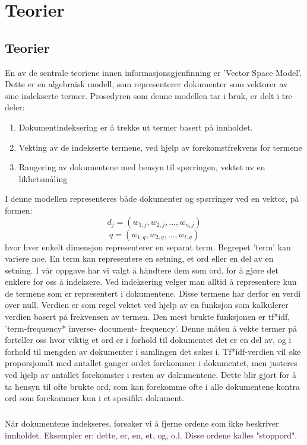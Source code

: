 \chapter{Teorier}
\section{Teorier}
En av de sentrale teoriene innen informasjonsgjenfinning er 'Vector Space Model'. Dette er en algebraisk modell, som representerer dokumenter som vektorer av sine indekserte termer. Prosedyren som denne modellen tar i bruk, er delt i tre deler:
\begin{enumerate}
\item{Dokumentindeksering er å trekke ut termer basert på innholdet.}
\item{Vekting av de indekserte termene, ved hjelp av forekomstfrekvens for termene}
\item{Rangering av dokumentene med hensyn til spørringen, vektet av en likhetsmåling}
\end{enumerate}
I denne modellen representeres både dokumenter og spørringer ved en vektor, på formen: \[d_j = (w_{1,j}, w_{2,j}, ..., w_{n,j})
\]
\[ 
q = (w_{1,q}, w_{2,q}, ..., w_{t,q})
\]
hvor hver enkelt dimensjon representerer en separat term. Begrepet 'term' kan variere noe. En term kan representere en setning, et ord eller en del av en setning. I vår oppgave har vi valgt å håndtere dem som ord, for å gjøre det enklere for oss å indeksere. Ved indeksering velger man alltid å representere kun de termene som er representert i dokumentene. Disse termene har derfor en verdi over null. Verdien er som regel vektet ved hjelp av en funksjon som kalkulerer verdien basert på frekvensen av termen. Den mest brukte funksjonen er tf*idf, 'term-frequency* inverse- document- frequency'. Denne måten å vekte termer på forteller oss hvor viktig et ord er i forhold til dokumentet det er en del av, og i forhold til mengden av dokumenter i samlingen det søkes i. Tf*idf-verdien vil øke proporsjonalt med antallet ganger ordet forekommer i dokumentet, men justeres ved hjelp av antallet forekomster i resten av dokumentene. Dette blir gjort for å ta hensyn til ofte brukte ord, som kan forekomme ofte i alle dokumentene kontra ord som forekommer kun i et spesifikt dokument. 

\paragraph{}
Når dokumentene indekseres, forsøker vi å fjerne ordene som ikke beskriver innholdet. Eksempler er: dette, er, en, et, og, o.l. Disse ordene kalles "stoppord". 

